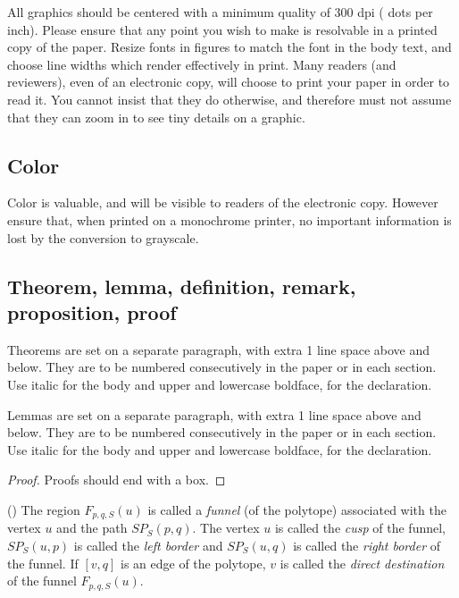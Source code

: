 All graphics should be centered with a minimum quality of 300 dpi ( dots per inch).  Please ensure that any point you wish to make is resolvable in a printed copy of the paper.  Resize fonts in figures to match the font in the body text, and choose line widths which render effectively in print.  Many readers (and reviewers), even of an electronic copy, will choose to print your paper in order to read it.  You cannot insist that they do otherwise, and therefore must not assume that they can zoom in to see tiny details on a graphic.

\subsection{Color}

Color is valuable, and will be visible to readers of the electronic copy.
However ensure that, when printed on a monochrome printer, no important
information is lost by the conversion to grayscale.

\subsection{Theorem, lemma, definition, remark, proposition, proof}
\begin{theorem}
    Theorems are set on a separate paragraph, with extra 1 line space above and below. They are to be numbered consecutively in the paper or in each section. Use italic for the body and upper and lowercase boldface, for the declaration.
\end{theorem}
\begin{lemma}
    Lemmas are set on a separate paragraph, with extra 1 line space above and below. They are to be numbered consecutively in the paper or in each section. Use italic for the body and upper and lowercase boldface, for the declaration.
\end{lemma}
\begin{proof}
    Proofs should end with a box.
    \end{proof}

\begin{definition}\rm(\cite{b3})
    The region \(F_{p,q,S}(u)\) is called a \textit{funnel} (of the polytope) associated with the vertex \(u\) and the path \(SP_S(p, q)\). The vertex \(u\) is called the \textit{cusp} of the funnel, \(SP_S(u, p)\) is called the \textit{left border} and \(SP_S(u, q)\) is called the \textit{right border} of the funnel. If \([v, q]\) is an edge of the polytope, \(v\) is called the \textit{direct destination} of the funnel \(F_{p,q,S}(u)\).
\end{definition}
